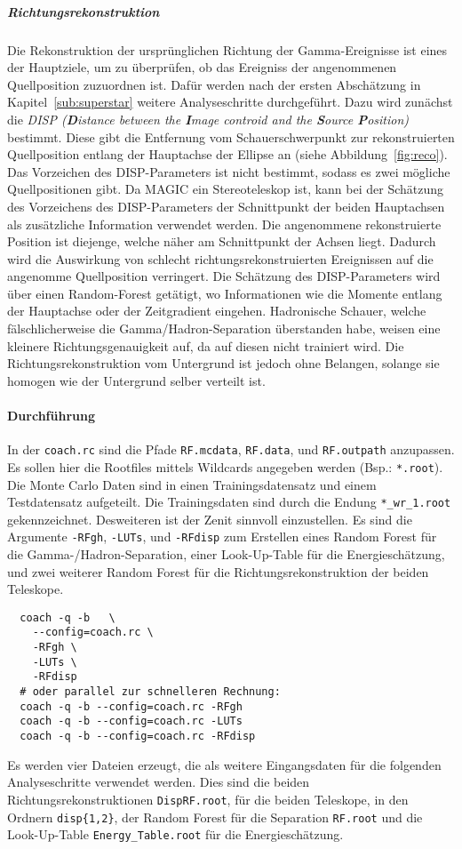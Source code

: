 \subparagraph{Richtungsrekonstruktion}%
\label{par:position}

Die Rekonstruktion der ursprünglich\-en Richtung der Gamma-Ereignisse 
ist eines der Hauptziele, um zu überprüfen, ob das Ereigniss der angenommenen
Quellposition zuzuordnen ist.
Dafür werden nach der ersten Abschätzung in Kapitel~\ref{sub:superstar} weitere
Analyseschritte durchgeführt.
Dazu wird zunächst die \textit{DISP (\textbf{D}istance between the
\textbf{I}mage controid and the \textbf{S}ource \textbf{P}osition)} bestimmt.
Diese gibt die Entfernung vom Schauerschwerpunkt zur rekonstruierten Quellposition
entlang der Hauptachse der Ellipse an (siehe Abbildung~\ref{fig:reco}).
Das Vorzeichen des DISP-Parameters ist nicht bestimmt,
sodass es zwei mögliche Quellpositionen gibt.
Da MAGIC ein Stereoteleskop ist,
kann bei der Schätzung des Vorzeichens des DISP-Parameters
der Schnittpunkt der beiden Hauptachsen als zusätzliche Information
verwendet werden.
Die angenommene rekonstruierte Position ist diejenge, welche näher am
Schnittpunkt der Achsen liegt.
Dadurch wird die Auswirkung von schlecht richtungsrekonstruierten Ereignissen
auf die angenomme Quellposition verringert.
Die Schätzung des DISP-Parameters wird über einen Random-Forest getätigt, 
wo Informationen wie die Momente entlang der Hauptachse oder der Zeitgradient eingehen.
Hadronische Schauer, welche fälschlicherweise die Gamma/Hadron-Separation
überstanden habe, weisen eine kleinere Richtungsgenauigkeit auf, da auf diesen
nicht trainiert wird.
Die Richtungsrekonstruktion vom Untergrund ist jedoch ohne Belangen, solange sie
homogen wie der Untergrund selber verteilt ist.


\paragraph{Durchführung}%
In der \texttt{coach.rc} sind die Pfade
\texttt{RF.mcdata},
\texttt{RF.data},
und \texttt{RF.outpath}
anzupassen.
Es sollen hier die Rootfiles mittels Wildcards angegeben werden
(Bsp.: \texttt{*.root}).
Die Monte Carlo Daten sind in einen Trainingsdatensatz
und einem Testdatensatz aufgeteilt.
Die Trainingsdaten sind durch die Endung
\texttt{*\_wr\_1.root} gekennzeichnet.
Desweiteren ist der Zenit sinnvoll einzustellen.
Es sind die Argumente
\texttt{-RFgh}, \texttt{-LUTs}, und \texttt{-RFdisp}
zum Erstellen eines Random Forest für die Gamma-/Hadron-Separation,
einer Look-Up-Table für die Energieschätzung,
und zwei weiterer Random Forest für die Richtungsrekonstruktion der beiden
Teleskope.

\begin{lstlisting}
  coach -q -b	\
    --config=coach.rc \
    -RFgh \
    -LUTs \
    -RFdisp
  # oder parallel zur schnelleren Rechnung:
  coach -q -b --config=coach.rc -RFgh
  coach -q -b --config=coach.rc -LUTs
  coach -q -b --config=coach.rc -RFdisp
\end{lstlisting}

Es werden vier Dateien erzeugt,
die als weitere Eingangsdaten für die folgenden Analyseschritte verwendet
werden.
Dies sind die beiden Richtungsrekonstruktionen \texttt{DispRF.root},
für die beiden Teleskope, 
in den Ordnern \texttt{disp\{1,2\}}, 
der Random Forest für die Separation
\texttt{RF.root} und die Look-Up-Table \texttt{Energy\_Table.root} für die
Energieschätzung.
